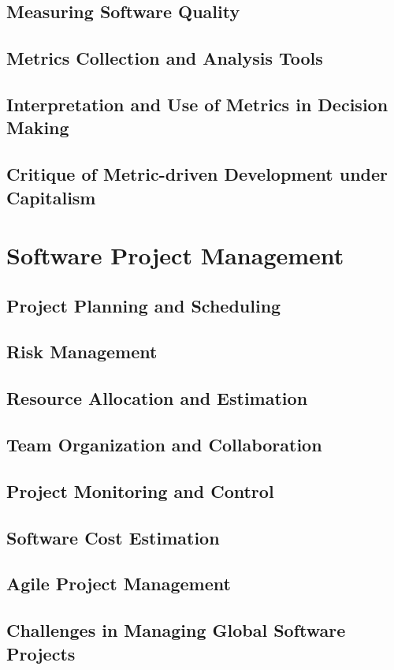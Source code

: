 \subsection{Measuring Software Quality}
\subsection{Metrics Collection and Analysis Tools}
\subsection{Interpretation and Use of Metrics in Decision Making}
\subsection{Critique of Metric-driven Development under Capitalism}

\newpage

\section{Software Project Management}
\subsection{Project Planning and Scheduling}
\subsection{Risk Management}
\subsection{Resource Allocation and Estimation}
\subsection{Team Organization and Collaboration}
\subsection{Project Monitoring and Control}
\subsection{Software Cost Estimation}
\subsection{Agile Project Management}
\subsection{Challenges in Managing Global Software Projects}

